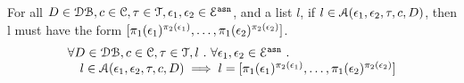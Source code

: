 %
\begin{lem}
\label{lem:inv_alg1}
For all $D \in \mathcal{DB} , c \in \mathcal{C}, \mathtt{\tau} \in \mathcal{T}, \mathtt{\epsilon}_1, \mathtt{\epsilon}_2 \in \mathcal{E}^{\mathtt{{asn}}}$, and a list $l$,
if $l \in \mathcal{A}(\mathtt{\epsilon}_1, \mathtt{\epsilon}_2, \mathtt{\tau}, c, D)$,
then l must have the form $[\pi_1(\mathtt{\epsilon}_1)^{\pi_2(\mathtt{\epsilon}_1)},\ldots, \pi_1(\mathtt{\epsilon}_2)^{\pi_2(\mathtt{\epsilon}_2)}]$.
\[
\begin{array}{l}
    \forall D \in \mathcal{DB} , c \in \mathcal{C}, \mathtt{\tau} \in \mathcal{T}, l ~.~ \forall \mathtt{\epsilon}_1, \mathtt{\epsilon}_2 \in \mathcal{E}^{\mathtt{{asn}}} ~.~
  \\ \quad 
 l\in \mathcal{A}(\mathtt{\epsilon}_1, \mathtt{\epsilon}_2, \mathtt{\tau}, c, D)  \implies  l = [\pi_1(\mathtt{\epsilon}_1)^{\pi_2(\mathtt{\epsilon}_1)},\ldots, \pi_1(\mathtt{\epsilon}_2)^{\pi_2(\mathtt{\epsilon}_2)}]
\end{array}
\]
\end{lem}
%
